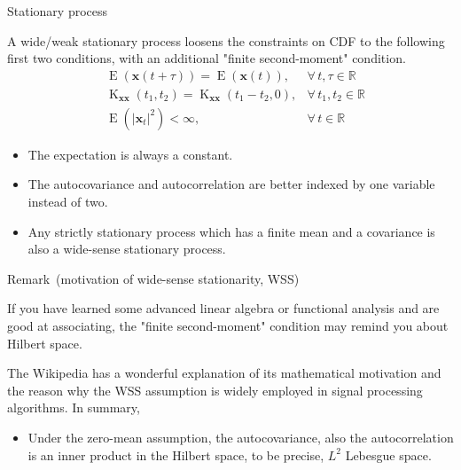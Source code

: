 \documentclass[utf-8, 10pt, aspectratio=1610]{beamer}
\begin{document}
\begin{frame}[allowframebreaks]{Stationary process}
	\begin{definition}
		A wide/weak stationary process loosens the constraints on CDF to the following first two conditions, with an additional "finite second-moment" condition.
		\begin{align}
			 & \operatorname{E}\left(\mathbf{x}(t+\tau)\right) = \operatorname{E}\left(\mathbf{x}(t)\right),                                  & \forall\, t,\tau \in \mathbb{R}  \\
			 & \operatorname{K}_{\mathbf{x}\mathbf{x}}\left(t_1, t_2\right) = \operatorname{K}_{\mathbf{x}\mathbf{x}}\left(t_1-t_2, 0\right), & \forall\, t_1,t_2 \in \mathbb{R} \\
			 & \operatorname{E}\left(\vert \mathbf{x}_t \vert^2 \right) < \infty,                                                             & \forall\, t \in \mathbb{R}
		\end{align}
	\end{definition}
	\vspace*{\fill}
	\framebreak
	\vspace*{\fill}
	\begin{corollary}
		\begin{itemize}
			\item The expectation is always a constant.
			\item The autocovariance and autocorrelation are better indexed by one variable instead of two.
			\item Any strictly stationary process which has a finite mean and a covariance is also a wide-sense stationary process.
		\end{itemize}
	\end{corollary}
	\vspace*{\fill}
	\framebreak
	\vspace*{\fill}
	\begin{block}{Remark\ (motivation of wide-sense stationarity, WSS)}
		\par If you have learned some advanced linear algebra or functional analysis and are good at associating, the "finite second-moment" condition may remind you about Hilbert space. 
        \par The Wikipedia \cite{enwiki:1166251052} has a wonderful explanation of its mathematical motivation and the reason why the WSS assumption is widely employed in signal processing algorithms.
        In summary,
        \begin{itemize}
            \item Under the zero-mean assumption, the autocovariance, also the autocorrelation is an inner product in the Hilbert space, to be precise, \(L^2\) Lebesgue space.
        \end{itemize} 
	\end{block}
	\vspace*{\fill}

\end{frame}
\end{document}
